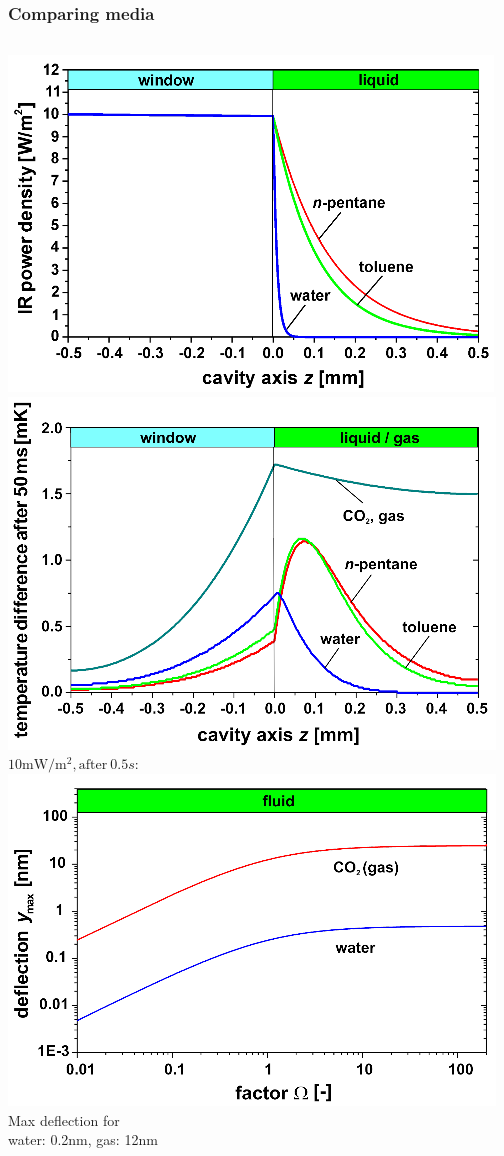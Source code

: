 \documentclass[14pt]{beamer}
\begin{document}
\begin{frame}
\frametitle{Comparing media}
\begin{columns}
\includegraphics[width=\textwidth]{IRPowerDensity.png}\\
\includegraphics[width=\textwidth]{TemperatureDist.png}
$10\mathrm{mW}/\mathrm{m}^2, \mathrm{after}~0.5s$:
\includegraphics[width=\textwidth]{maxdeflexion.png}\\
Max deflection for \\water: 0.2nm, gas: 12nm\\
\end{columns}
\end{frame}
\end{document}
